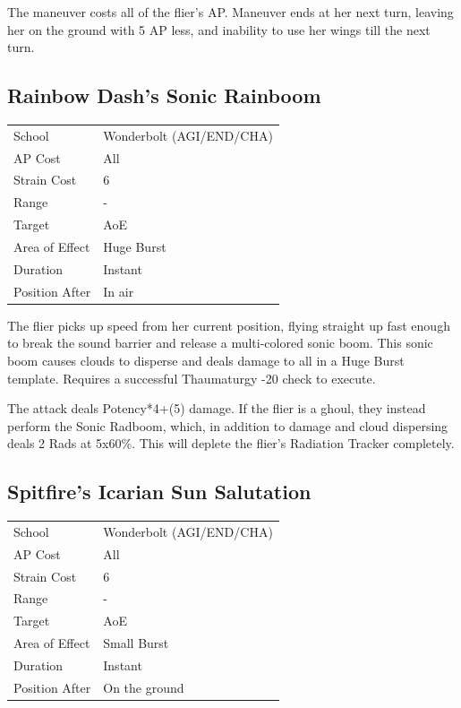 \documentclass[11pt,a4paper,twocolumn]{book}
\begin{document}
The maneuver costs all of the flier's AP. Maneuver ends at her next turn, leaving her on the ground with 5 AP less, and inability to use her wings till the next turn.

\subsection*{Rainbow Dash's Sonic Rainboom}
{
	\begin{tabu} to 75mm{| X[l,4] | X[l,7] |}
		\hline
		School 			& Wonderbolt (AGI/END/CHA)		\\
        AP Cost	      	& All 				\\
        Strain Cost     & 6 				\\
        Range     		& - 				\\
        Target      	& AoE 				\\
        Area of Effect  & Huge Burst 	 	\\
        Duration     	& Instant 	 		\\
		Position After  & In air 			\\ \hline
	\end{tabu}
		
}

\medskip

The flier picks up speed from her current position, flying straight up fast enough to break the sound barrier and release a multi-colored sonic boom. This sonic boom causes clouds to disperse and deals damage to all in a Huge Burst template. Requires a successful Thaumaturgy -20 check to execute.

The attack deals Potency*4+(5) damage. If the flier is a ghoul, they instead perform the Sonic Radboom, which, in addition to damage and cloud dispersing deals 2 Rads at 5x60\%. This will deplete the flier's Radiation Tracker completely.

\vfill

\subsection*{Spitfire's Icarian Sun Salutation}
{
	\begin{tabu} to 75mm{| X[l,4] | X[l,7] |}
		\hline
		School 			& Wonderbolt (AGI/END/CHA)		\\
        AP Cost	      	& All 		\\
        Strain Cost     & 6 				\\
        Range     		& - 				\\
        Target      	& AoE 				\\
        Area of Effect  & Small Burst 	 	\\
        Duration     	& Instant 	 		\\
		Position After  & On the ground 	\\ \hline
	\end{tabu}
		
}
\end{document}
